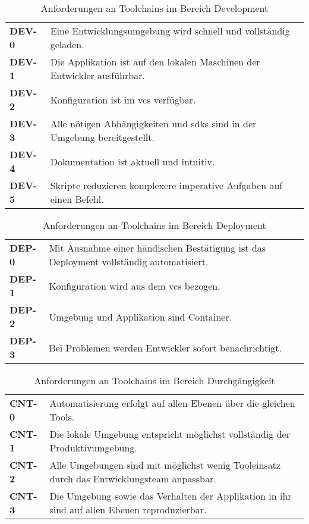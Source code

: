 \begin{table}[H]
    \begin{tabular}{ >{\bfseries\ttfamily}p{} >{}p{} }
        DEV-0   &   Eine Entwicklungsumgebung wird schnell und vollständig geladen. \\
        DEV-1   &   Die Applikation ist auf den lokalen Maschinen der Entwickler ausführbar. \\
        DEV-2   &   Konfiguration ist im \Gls{vcs} verfügbar. \\
        DEV-3   &   Alle nötigen Abhängigkeiten und \Glspl{sdk} \newline sind in der Umgebung bereitgestellt. \\
        DEV-4   &   Dokumentation ist aktuell und intuitiv. \\
        DEV-5   &   Skripte reduzieren komplexere imperative Aufgaben auf einen Befehl. \\
    \end{tabular}
    \caption{Anforderungen an Toolchains im Bereich Development}
    \label{tab:requirements-development}
\end{table}

\begin{table}[H]
    \begin{tabular}{ >{\bfseries\ttfamily}p{} >{}p{} }
        DEP-0   &   Mit Ausnahme einer händischen Bestätigung ist \newline das Deployment vollständig automatisiert. \\
        DEP-1   &   Konfiguration wird aus dem \Gls{vcs} bezogen. \\
        DEP-2   &   Umgebung und Applikation sind Container. \\
        DEP-3   &   Bei Problemen werden Entwickler sofort benachrichtigt. \\
    \end{tabular}
    \caption{Anforderungen an Toolchains im Bereich Deployment}
    \label{tab:requirements-deployment}
\end{table}

\begin{table}[H]
    \begin{tabular}{ >{\bfseries\ttfamily}p{} >{}p{} }
        CNT-0   &   Automatisierung erfolgt auf allen Ebenen über die gleichen Tools. \\
        CNT-1   &   Die lokale Umgebung entspricht möglichst \newline vollständig der Produktivumgebung. \\
        CNT-2   &   Alle Umgebungen sind mit möglichst wenig Tooleinsatz \newline durch das Entwicklungsteam anpassbar. \\
        CNT-3   &   Die Umgebung sowie das Verhalten der Applikation in ihr \newline sind auf allen Ebenen reproduzierbar. \\
    \end{tabular}
    \caption{Anforderungen an Toolchains im Bereich Durchgängigkeit}
    \label{tab:requirements-continuity}
\end{table}

